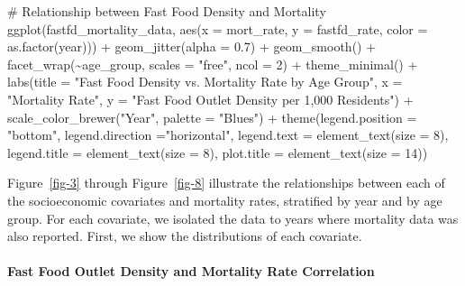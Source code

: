 \documentclass[
  letterpaper,
  DIV=11,
  numbers=noendperiod]{scrartcl}
\let\oldparagraph\paragraph
\renewcommand{\paragraph}[1]{\oldparagraph{#1}\mbox{}}
\newenvironment{Shaded}{\begin{snugshade}}{\end{snugshade}}
\newcommand{\AttributeTok}[1]{\textcolor[rgb]{0.40,0.45,0.13}{#1}}
\newcommand{\CommentTok}[1]{\textcolor[rgb]{0.37,0.37,0.37}{#1}}
\newcommand{\DecValTok}[1]{\textcolor[rgb]{0.68,0.00,0.00}{#1}}
\newcommand{\FloatTok}[1]{\textcolor[rgb]{0.68,0.00,0.00}{#1}}
\newcommand{\FunctionTok}[1]{\textcolor[rgb]{0.28,0.35,0.67}{#1}}
\newcommand{\NormalTok}[1]{\textcolor[rgb]{0.00,0.23,0.31}{#1}}
\newcommand{\SpecialCharTok}[1]{\textcolor[rgb]{0.37,0.37,0.37}{#1}}
\newcommand{\StringTok}[1]{\textcolor[rgb]{0.13,0.47,0.30}{#1}}
\begin{document}
\begin{Shaded}
\begin{Highlighting}[]
\CommentTok{\# Relationship between Fast Food Density and Mortality }
\FunctionTok{ggplot}\NormalTok{(fastfd\_mortality\_data, }\FunctionTok{aes}\NormalTok{(}\AttributeTok{x =}\NormalTok{ mort\_rate, }\AttributeTok{y =}\NormalTok{ fastfd\_rate, }\AttributeTok{color =} \FunctionTok{as.factor}\NormalTok{(year))) }\SpecialCharTok{+}
  \FunctionTok{geom\_jitter}\NormalTok{(}\AttributeTok{alpha =} \FloatTok{0.7}\NormalTok{) }\SpecialCharTok{+}
  \FunctionTok{geom\_smooth}\NormalTok{() }\SpecialCharTok{+}
 \FunctionTok{facet\_wrap}\NormalTok{(}\SpecialCharTok{\textasciitilde{}}\NormalTok{age\_group, }\AttributeTok{scales =} \StringTok{"free"}\NormalTok{, }\AttributeTok{ncol =} \DecValTok{2}\NormalTok{) }\SpecialCharTok{+}
  \FunctionTok{theme\_minimal}\NormalTok{() }\SpecialCharTok{+}
  \FunctionTok{labs}\NormalTok{(}\AttributeTok{title =} \StringTok{"Fast Food Density vs. Mortality Rate by Age Group"}\NormalTok{,}
       \AttributeTok{x =} \StringTok{"Mortality Rate"}\NormalTok{,}
       \AttributeTok{y =} \StringTok{"Fast Food Outlet Density per 1,000 Residents"}\NormalTok{) }\SpecialCharTok{+}
  \FunctionTok{scale\_color\_brewer}\NormalTok{(}\StringTok{"Year"}\NormalTok{, }\AttributeTok{palette =} \StringTok{"Blues"}\NormalTok{) }\SpecialCharTok{+}
  \FunctionTok{theme}\NormalTok{(}\AttributeTok{legend.position =} \StringTok{"bottom"}\NormalTok{, }
        \AttributeTok{legend.direction =}\StringTok{"horizontal"}\NormalTok{,}
        \AttributeTok{legend.text =} \FunctionTok{element\_text}\NormalTok{(}\AttributeTok{size =} \DecValTok{8}\NormalTok{),}
        \AttributeTok{legend.title =} \FunctionTok{element\_text}\NormalTok{(}\AttributeTok{size =} \DecValTok{8}\NormalTok{),}
        \AttributeTok{plot.title =} \FunctionTok{element\_text}\NormalTok{(}\AttributeTok{size =} \DecValTok{14}\NormalTok{)) }
\end{Highlighting}
\end{Shaded}

Figure~\ref{fig-3} through Figure~\ref{fig-8} illustrate the
relationships between each of the socioeconomic covariates and mortality
rates, stratified by year and by age group. For each covariate, we
isolated the data to years where mortality data was also reported.
First, we show the distributions of each covariate.

\hypertarget{fast-food-outlet-density-and-mortality-rate-correlation}{%
\paragraph{Fast Food Outlet Density and Mortality Rate
Correlation}\label{fast-food-outlet-density-and-mortality-rate-correlation}}
\end{document}
